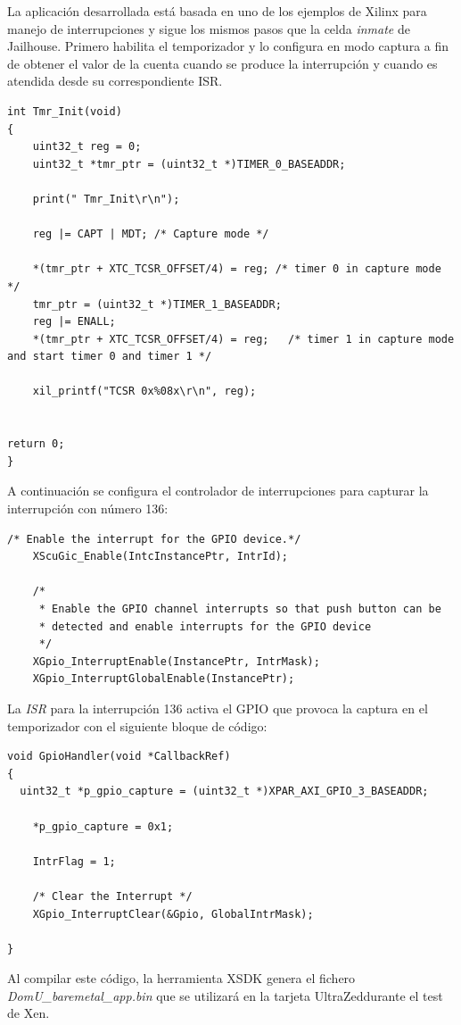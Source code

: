 La aplicación desarrollada está basada en uno de los ejemplos de Xilinx para manejo de interrupciones y sigue los mismos pasos que la celda \textit{inmate} de Jailhouse.
Primero habilita el temporizador y lo configura en modo captura a fin de obtener el valor de la cuenta cuando se produce la interrupción y cuando es atendida desde su correspondiente \acrshort{ISR}.

\begin{lstlisting}[style=CStyle]
int Tmr_Init(void)
{
	uint32_t reg = 0;
	uint32_t *tmr_ptr = (uint32_t *)TIMER_0_BASEADDR;

	print(" Tmr_Init\r\n");

	reg |= CAPT | MDT; /* Capture mode */

	*(tmr_ptr + XTC_TCSR_OFFSET/4) = reg; /* timer 0 in capture mode */
	tmr_ptr = (uint32_t *)TIMER_1_BASEADDR;
	reg |= ENALL;
	*(tmr_ptr + XTC_TCSR_OFFSET/4) = reg;   /* timer 1 in capture mode and start timer 0 and timer 1 */

	xil_printf("TCSR 0x%08x\r\n", reg);


return 0;
}
\end{lstlisting}

A continuación se configura el controlador de interrupciones para capturar la interrupción con número 136:
\begin{lstlisting}[style=CStyle]
/* Enable the interrupt for the GPIO device.*/
	XScuGic_Enable(IntcInstancePtr, IntrId);

	/*
	 * Enable the GPIO channel interrupts so that push button can be
	 * detected and enable interrupts for the GPIO device
	 */
	XGpio_InterruptEnable(InstancePtr, IntrMask);
	XGpio_InterruptGlobalEnable(InstancePtr);
\end{lstlisting}

La \textit{ISR} para la interrupción 136 activa el \acrshort{GPIO} que provoca la captura en el temporizador con el siguiente bloque de código:
\begin{lstlisting}[style=CStyle]
void GpioHandler(void *CallbackRef)
{
  uint32_t *p_gpio_capture = (uint32_t *)XPAR_AXI_GPIO_3_BASEADDR;

	*p_gpio_capture = 0x1;

	IntrFlag = 1;

	/* Clear the Interrupt */
	XGpio_InterruptClear(&Gpio, GlobalIntrMask);

}
\end{lstlisting}

Al compilar este código, la herramienta \acrshort{XSDK} genera el fichero \textit{DomU\_baremetal\_app.bin} que se utilizará en la tarjeta UltraZed\texttrademark durante el test de Xen.


